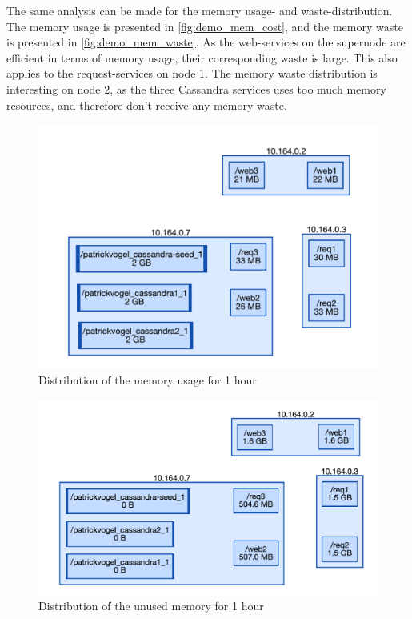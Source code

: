 \noindent
The same analysis can be made for the memory usage- and waste-distribution. The memory usage is presented in \autoref{fig:demo_mem_cost}, and the memory waste is presented in \autoref{fig:demo_mem_waste}. As the web-services on the supernode are efficient in terms of memory usage, their corresponding waste is large. This also applies to the request-services on node $1$. The memory waste distribution is interesting on node $2$, as the three Cassandra services uses too much memory resources, and therefore don't receive any memory waste.\\

\begin{figure}
    \centering
    \includegraphics[width=\textwidth]{gfx/demo_mem_cost}
    \caption{Distribution of the memory usage for 1 hour}
    \label{fig:demo_mem_cost}
\end{figure}

\begin{figure}
    \centering
    \includegraphics[width=\textwidth]{gfx/demo_mem_waste}
    \caption{Distribution of the unused memory for 1 hour}
    \label{fig:demo_mem_waste}
\end{figure}


